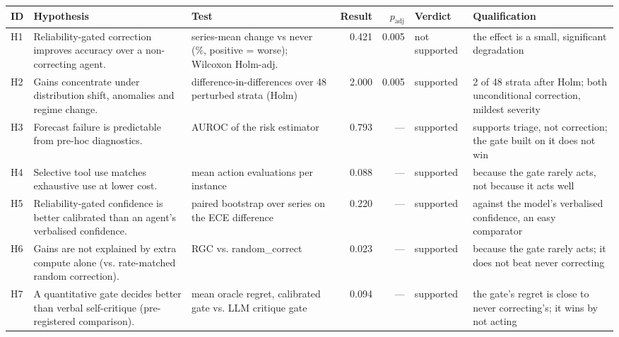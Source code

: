 \begin{tabular}{lp{3.4cm}p{2.9cm}rrlp{3.6cm}}
\toprule
ID & Hypothesis & Test & Result & $p_{\text{adj}}$ & Verdict & Qualification \\
\midrule
H1 & Reliability-gated correction improves accuracy over a non-correcting agent. & series-mean change vs never (\%, positive = worse); Wilcoxon Holm-adj. & 0.421 & 0.005 & not supported & the effect is a small, significant degradation \\
H2 & Gains concentrate under distribution shift, anomalies and regime change. & difference-in-differences over 48 perturbed strata (Holm) & 2.000 & 0.005 & supported & 2 of 48 strata after Holm; both unconditional correction, mildest severity \\
H3 & Forecast failure is predictable from pre-hoc diagnostics. & AUROC of the risk estimator & 0.793 & --- & supported & supports triage, not correction; the gate built on it does not win \\
H4 & Selective tool use matches exhaustive use at lower cost. & mean action evaluations per instance & 0.088 & --- & supported & because the gate rarely acts, not because it acts well \\
H5 & Reliability-gated confidence is better calibrated than an agent's verbalised confidence. & paired bootstrap over series on the ECE difference & 0.220 & --- & supported & against the model's verbalised confidence, an easy comparator \\
H6 & Gains are not explained by extra compute alone (vs. rate-matched random correction). & RGC vs. random\_correct & 0.023 & --- & supported & because the gate rarely acts; it does not beat never correcting \\
H7 & A quantitative gate decides better than verbal self-critique (pre-registered comparison). & mean oracle regret, calibrated gate vs. LLM critique gate & 0.094 & --- & supported & the gate's regret is close to never correcting's; it wins by not acting \\
\bottomrule
\end{tabular}
